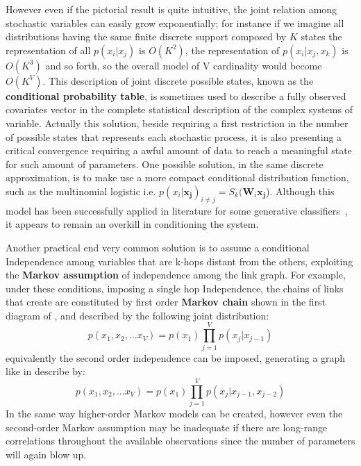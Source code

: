 However even if the pictorial result is quite intuitive, the joint relation among stochastic variables can easily grow exponentially; for instance if we imagine all distributions having the same finite discrete support composed by $K$ states the representation of all $p(x_i|x_j)$ is $O(K^2)$, the representation of $p(x_i|x_j,x_k)$ is $O(K^3)$ and so forth, so the overall model of V cardinality would become $O(K^V)$. This description of joint discrete possible states, known as the \textbf{conditional probability table}, is sometimes used to describe a fully observed covariates vector in the complete statistical description of the complex systems of variable. Actually this solution, beside requiring a first restriction in the number of possible states that represents each stochastic process, it is also presenting a critical convergence requiring a awful amount of data to reach a meaningful state for such amount of parameters.
One possible solution, in the same discrete approximation, is to make use a more compact conditional distribution function, such as the multinomial logistic i.e. $p(x_i | \bm{x_j})_{i \neq j} = S_k(\bm{W}_i \bm{x_{j}}$). Although this model has been successfully applied in literature for some generative classifiers~\cite{Bengio:1999:MHD:3009657.3009714}, it appears to remain an overkill in conditioning the system.

Another practical end very common solution is to assume a conditional Independence among variables that are k-hops distant from the others, exploiting the \textbf{Markov assumption} of independence among the link graph.
For example, under these conditions, imposing a single hop Independence, the chains of links that create are constituted by first order \textbf{Markov chain} shown in the first diagram of \Figure{\ref{fig:simple_markov_chains_a}}, and described by the following joint distribution:
\begin{equation}
    p(x_1, x_2, ... x_V) = p(x_1) \prod_{j=1}^V p(x_j|x_{j-1})
\end{equation}
equivalently the second order independence can be imposed, generating a graph like in \Figure{\ref{fig:simple_markov_chains_b}} describe by:
\begin{equation}
    p(x_1, x_2, ... x_V) = p(x_1) \prod_{j=1}^V p(x_j|x_{j-1},x_{j-2})
\end{equation}
In the same way higher-order Markov models can be created, however even the second-order Markov assumption may be inadequate if there are long-range correlations throughout the available observations since the number of parameters will again blow up. 





